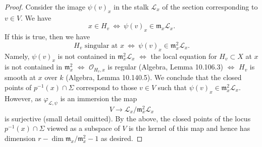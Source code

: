 \begin{proof}
Consider the image $\psi(v)_x$ in the stalk $\mathcal L_x$ of the section corresponding to $v\in V$. We have
\[x\in H_v\ \Leftrightarrow\ \psi(v)_x\in\mathfrak m_x\mathcal L_x.\]
If this is true, then we have
\[H_v\text{ singular at }x\ \Leftrightarrow\ \psi(v)_x\in\mathfrak m_x^2\mathcal L_x.\]
Namely, $\psi(v)_x$ is not contained in $\mathfrak m_x^2\mathcal L_x$ $\Leftrightarrow$ the local equation for $H_v\subset X$ at $x$ is not contained in $\mathfrak m_x^2$ $\Leftrightarrow$ $\mathcal O_{H_v,x}$ is regular (Algebra, Lemma 10.106.3) $\Leftrightarrow$ $H_v$ is smooth at $x$ over $k$ (Algebra, Lemma 10.140.5). We conclude that the closed points of $p^{-1}(x)\cap\Sigma$ correspond to those $v\in V$ such that $\psi(v)_x\in\mathfrak m_x^2\mathcal L_x$. However, as $\varphi_{\mathcal L,\psi}$ is an immersion the map
\[V\longrightarrow\mathcal L_x/\mathfrak m_x^2\mathcal L_x\]
is surjective (small detail omitted). By the above, the closed points of the locus $p^{-1}(x)\cap\Sigma$ viewed as a subspace of $V$ is the kernel of this map and hence has dimension $r-\dim\mathfrak m_x/\mathfrak m_x^2-1$ as desired.
\end{proof}
